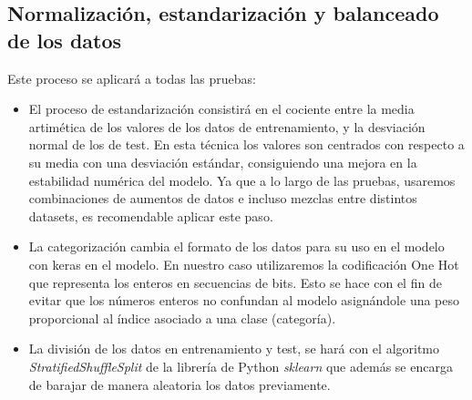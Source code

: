 \documentclass[11pt,a4paper,spanish]{book}
\begin{document}
	\subsection{Normalización, estandarización y balanceado de los datos}
	\label{cap:normalizacion}
	Este proceso se aplicará a todas las pruebas:
	\begin{itemize}
		\item El proceso de estandarización consistirá en el cociente entre la media artimética de los valores de los datos de entrenamiento, y la desviación normal de los de test. En esta técnica los valores son centrados con respecto a su media con una desviación estándar, consiguiendo una mejora en la estabilidad numérica del modelo. Ya que a lo largo de las pruebas, usaremos combinaciones de aumentos de datos e incluso mezclas entre distintos datasets, es recomendable aplicar este paso.
		
		\item  La categorización cambia el formato de los datos para su uso en el modelo con keras en el modelo. En nuestro caso utilizaremos la codificación One Hot que representa los enteros en secuencias de bits. Esto se hace con el fin de evitar que los números enteros no confundan al modelo asignándole una peso proporcional al índice asociado a una clase (categoría).
		
		\item La división de los datos en entrenamiento y test, se hará con el algoritmo \emph{StratifiedShuffleSplit} de la librería de Python \emph{sklearn} que además se encarga de barajar de manera aleatoria los datos previamente.
		
	\end{itemize}

	
	
\end{document}
